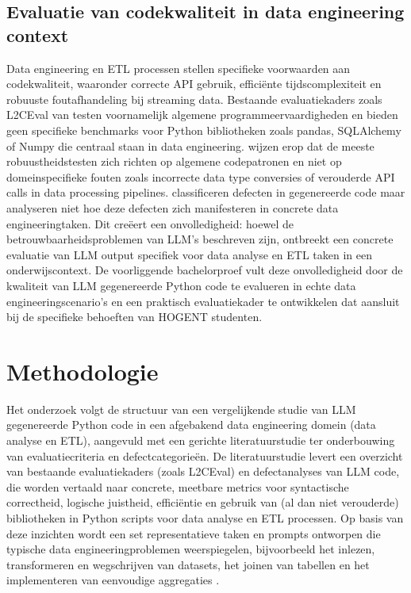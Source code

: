\documentclass{hogent-article}
\begin{document}
\subsection{Evaluatie van codekwaliteit in data engineering context}

Data engineering en ETL processen stellen specifieke voorwaarden aan codekwaliteit, waaronder correcte API gebruik, efficiënte tijdscomplexiteit en robuuste foutafhandeling bij streaming data. Bestaande evaluatiekaders zoals L2CEval van \textcite{Zhong2023} testen voornamelijk algemene programmeervaardigheden en bieden geen specifieke benchmarks voor Python bibliotheken zoals pandas, SQLAlchemy of Numpy die centraal staan in data engineering. \textcite{Zhong2023} wijzen erop dat de meeste robuustheidstesten zich richten op algemene codepatronen en niet op domeinspecifieke fouten zoals incorrecte data type conversies of verouderde API calls in data processing pipelines. \textcite{Esfahani2024} classificeren defecten in gegenereerde code maar analyseren niet hoe deze defecten zich manifesteren in concrete data engineeringtaken. Dit creëert een onvolledigheid: hoewel de betrouwbaarheidsproblemen van LLM's beschreven zijn, ontbreekt een concrete evaluatie van LLM output specifiek voor data analyse en ETL taken in een onderwijscontext. De voorliggende bachelorproef vult deze onvolledigheid door de kwaliteit van LLM gegenereerde Python code te evalueren in echte data engineeringscenario's en een praktisch evaluatiekader te ontwikkelen dat aansluit bij de specifieke behoeften van HOGENT studenten.

\section{Methodologie}%
\label{sec:methodologie}

Het onderzoek volgt de structuur van een vergelijkende studie van LLM gegenereerde Python code in een afgebakend data engineering domein (data analyse en ETL), aangevuld met een gerichte literatuurstudie ter onderbouwing van evaluatiecriteria en defectcategorieën. De literatuurstudie levert een overzicht van bestaande evaluatiekaders (zoals L2CEval) en defectanalyses van LLM code, die worden vertaald naar concrete, meetbare metrics voor syntactische correctheid, logische juistheid, efficiëntie en gebruik van (al dan niet verouderde) bibliotheken in Python scripts voor data analyse en ETL processen. Op basis van deze inzichten wordt een set representatieve taken en prompts ontworpen die typische data engineeringproblemen weerspiegelen, bijvoorbeeld het inlezen, transformeren en wegschrijven van datasets, het joinen van tabellen en het implementeren van eenvoudige aggregaties \autocite{Ni2024}.​
\end{document}
